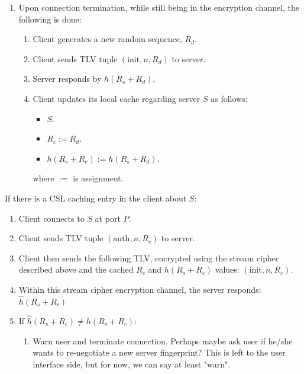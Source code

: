 \documentclass{article}
\begin{document}
\begin{enumerate}
\begin{enumerate}
            \item Upon connection termination, while still being in the
            encryption channel, the following is done:
                \begin{enumerate}
                    \item Client generates a new random sequence, $R_d$.
                    \item Client sends TLV tuple $(\text{init}, n, R_d)$ to
                    server.
                    \item Server responds by $h(R_s + R_d)$.
                    \item Client updates its local cache regarding server $S$
                    as follows:
                        \begin{itemize}
                            \item $S$.
                            \item $R_c := R_d$.
                            \item $h(R_s + R_c) := h(R_s + R_d)$.
                        \end{itemize}
                        where $:=$ is assignment.
                \end{enumerate}
        \end{enumerate}
    If there is a CSL caching entry in the client about $S$:
    \begin{enumerate}
        \item Client connects to $S$ at port $P$.
        \item Client sends TLV tuple $(\text{auth}, n, R_c)$ to server.
        \item Client then sends the following TLV, encrypted using the
        stream cipher described above and the cached $R_c$
        and $h(R_s + R_c)$ values: $(\text{init}, n, R_c)$.
        \item Within this stream cipher encryption channel, the
        server responds: $\hat h(R_s + R_c)$
        \item If $\hat h(R_s + R_c) \ne h(R_s + R_c)$:
            \begin{enumerate}
                \item Warn user and terminate connection. Perhaps maybe ask
                user if he/she wants to re-negotiate a new server fingerprint?
                This is left to the user interface side, but for now, we can
                say at least "warn".
            \end{enumerate}

\end{enumerate}
\end{enumerate}
\end{document}
